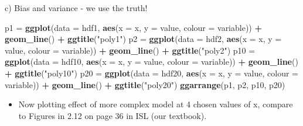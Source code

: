 \documentclass[ignorenonframetext,]{beamer}
\newenvironment{Shaded}{\begin{snugshade}}{\end{snugshade}}
\newcommand{\KeywordTok}[1]{\textcolor[rgb]{0.13,0.29,0.53}{\textbf{#1}}}
\newcommand{\DataTypeTok}[1]{\textcolor[rgb]{0.13,0.29,0.53}{#1}}
\newcommand{\StringTok}[1]{\textcolor[rgb]{0.31,0.60,0.02}{#1}}
\newcommand{\OperatorTok}[1]{\textcolor[rgb]{0.81,0.36,0.00}{\textbf{#1}}}
\newcommand{\NormalTok}[1]{#1}
\providecommand{\tightlist}{%
  \setlength{\itemsep}{0pt}\setlength{\parskip}{0pt}}
\begin{document}
\begin{frame}[fragile]
\begin{block}{c) Bias and variance - we use the truth!}
\begin{Shaded}
\begin{Highlighting}[]
\NormalTok{p1 =}\StringTok{ }\KeywordTok{ggplot}\NormalTok{(}\DataTypeTok{data =}\NormalTok{ hdf1, }\KeywordTok{aes}\NormalTok{(}\DataTypeTok{x =}\NormalTok{ x, }\DataTypeTok{y =}\NormalTok{ value, }\DataTypeTok{colour =}\NormalTok{ variable)) }\OperatorTok{+}\StringTok{ }
\StringTok{    }\KeywordTok{geom_line}\NormalTok{() }\OperatorTok{+}\StringTok{ }\KeywordTok{ggtitle}\NormalTok{(}\StringTok{"poly1"}\NormalTok{)}
\NormalTok{p2 =}\StringTok{ }\KeywordTok{ggplot}\NormalTok{(}\DataTypeTok{data =}\NormalTok{ hdf2, }\KeywordTok{aes}\NormalTok{(}\DataTypeTok{x =}\NormalTok{ x, }\DataTypeTok{y =}\NormalTok{ value, }\DataTypeTok{colour =}\NormalTok{ variable)) }\OperatorTok{+}\StringTok{ }
\StringTok{    }\KeywordTok{geom_line}\NormalTok{() }\OperatorTok{+}\StringTok{ }\KeywordTok{ggtitle}\NormalTok{(}\StringTok{"poly2"}\NormalTok{)}
\NormalTok{p10 =}\StringTok{ }\KeywordTok{ggplot}\NormalTok{(}\DataTypeTok{data =}\NormalTok{ hdf10, }\KeywordTok{aes}\NormalTok{(}\DataTypeTok{x =}\NormalTok{ x, }\DataTypeTok{y =}\NormalTok{ value, }\DataTypeTok{colour =}\NormalTok{ variable)) }\OperatorTok{+}\StringTok{ }
\StringTok{    }\KeywordTok{geom_line}\NormalTok{() }\OperatorTok{+}\StringTok{ }\KeywordTok{ggtitle}\NormalTok{(}\StringTok{"poly10"}\NormalTok{)}
\NormalTok{p20 =}\StringTok{ }\KeywordTok{ggplot}\NormalTok{(}\DataTypeTok{data =}\NormalTok{ hdf20, }\KeywordTok{aes}\NormalTok{(}\DataTypeTok{x =}\NormalTok{ x, }\DataTypeTok{y =}\NormalTok{ value, }\DataTypeTok{colour =}\NormalTok{ variable)) }\OperatorTok{+}\StringTok{ }
\StringTok{    }\KeywordTok{geom_line}\NormalTok{() }\OperatorTok{+}\StringTok{ }\KeywordTok{ggtitle}\NormalTok{(}\StringTok{"poly20"}\NormalTok{)}
\KeywordTok{ggarrange}\NormalTok{(p1, p2, p10, p20)}
\end{Highlighting}
\end{Shaded}

\begin{itemize}
\tightlist
\item
  Now plotting effect of more complex model at 4 chosen values of x,
  compare to Figures in 2.12 on page 36 in ISL (our textbook).
\end{itemize}


\end{block}
\end{frame}
\end{document}
